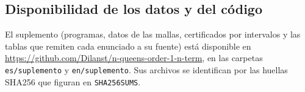 \subsection{Disponibilidad de los datos y del código}\label{sec:disponibilidad}
El suplemento (programas, datos de las mallas, certificados por intervalos y las tablas que remiten cada
enunciado a su fuente) está disponible en \url{https://github.com/Dilanst/n-queens-order-1-n-term}, en
las carpetas \texttt{es/suplemento} y \texttt{en/suplemento}. Sus archivos se identifican por las
huellas SHA256 que figuran en \texttt{SHA256SUMS}.
